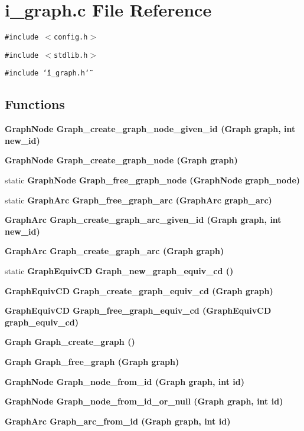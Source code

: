\section{i\_\-graph.c File Reference}
\label{i__graph_8c}
{\tt \#include $<$config.h$>$}\par
{\tt \#include $<$stdlib.h$>$}\par
{\tt \#include \char`\"{}i\_\-graph.h\char`\"{}}\par
\subsection*{Functions}
\begin{CompactItemize}
\item 
\bf{Graph\-Node} \bf{Graph\_\-create\_\-graph\_\-node\_\-given\_\-id} (\bf{Graph} \bf{graph}, int new\_\-id)
\item 
\bf{Graph\-Node} \bf{Graph\_\-create\_\-graph\_\-node} (\bf{Graph} \bf{graph})
\item 
static \bf{Graph\-Node} \bf{Graph\_\-free\_\-graph\_\-node} (\bf{Graph\-Node} \bf{graph\_\-node})
\item 
static \bf{Graph\-Arc} \bf{Graph\_\-free\_\-graph\_\-arc} (\bf{Graph\-Arc} \bf{graph\_\-arc})
\item 
\bf{Graph\-Arc} \bf{Graph\_\-create\_\-graph\_\-arc\_\-given\_\-id} (\bf{Graph} \bf{graph}, int new\_\-id)
\item 
\bf{Graph\-Arc} \bf{Graph\_\-create\_\-graph\_\-arc} (\bf{Graph} \bf{graph})
\item 
static \bf{Graph\-Equiv\-CD} \bf{Graph\_\-new\_\-graph\_\-equiv\_\-cd} ()
\item 
\bf{Graph\-Equiv\-CD} \bf{Graph\_\-create\_\-graph\_\-equiv\_\-cd} (\bf{Graph} \bf{graph})
\item 
\bf{Graph\-Equiv\-CD} \bf{Graph\_\-free\_\-graph\_\-equiv\_\-cd} (\bf{Graph\-Equiv\-CD} \bf{graph\_\-equiv\_\-cd})
\item 
\bf{Graph} \bf{Graph\_\-create\_\-graph} ()
\item 
\bf{Graph} \bf{Graph\_\-free\_\-graph} (\bf{Graph} \bf{graph})
\item 
\bf{Graph\-Node} \bf{Graph\_\-node\_\-from\_\-id} (\bf{Graph} \bf{graph}, int id)
\item 
\bf{Graph\-Node} \bf{Graph\_\-node\_\-from\_\-id\_\-or\_\-null} (\bf{Graph} \bf{graph}, int id)
\item 
\bf{Graph\-Arc} \bf{Graph\_\-arc\_\-from\_\-id} (\bf{Graph} \bf{graph}, int id)

\end{CompactItemize}

